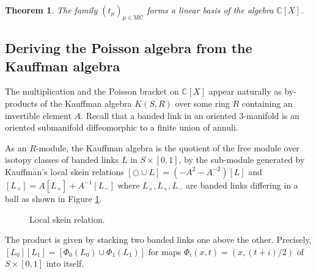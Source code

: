 \documentclass{amsart}
\newtheorem{theorem}{Theorem}
\newcommand{\C}{\mathbb{C}}
\newcommand{\MC}{\mathrm{MC}}
\begin{document}
\begin{theorem}
The family $(t_\mu)_{\mu\in \MC}$ forms a linear basis of the algebra $\C[X]$.
\end{theorem}




\subsection{Deriving the Poisson algebra from the Kauffman algebra}

The multiplication and the Poisson bracket on $\C[X]$ appear naturally as by-products of the Kauffman algebra $K(S,R)$ over some ring $R$ containing an invertible element $A$. Recall that a banded link in an oriented 3-manifold is an oriented submanifold diffeomorphic to a finite union of annuli.

As an $R$-module, the Kauffman algebra is the quotient of the free module over isotopy classes of banded links $L$ in $S\times[0,1]$, by the sub-module generated by Kauffman's local skein relations $[\bigcirc \cup L]=(-A^2-A^{-2})[L]$ and $[L_\times]=A[L_+]+A^{-1}[L_-]$ where $L_\times,L_+,L_-$ are banded links differing in a ball as shown in Figure \ref{fig:kauffman}.

\begin{figure}[htbp]
    \centering
    \def\svgwidth{6cm}
    
    \caption{Local skein relation.}
    \label{fig:kauffman}
\end{figure}

The product is given by stacking two banded links one above the other. Precisely, $[L_0][L_1]=[\Phi_0(L_0)\cup\Phi_1(L_1)]$ for maps $\Phi_i(x,t)=(x,(t+i)/2)$ of $S\times [0,1]$ into itself. 
\end{document}
